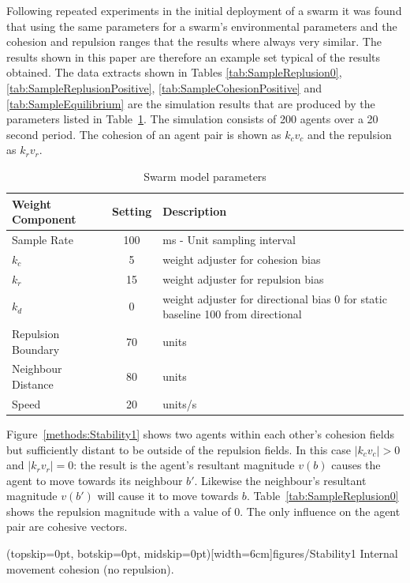 \documentclass{ieeeaccess}
\begin{document}
Following repeated experiments in the initial deployment of a swarm it was found that using the same parameters for a swarm's environmental parameters and the cohesion and repulsion ranges that the results where always very similar. The results shown in this paper are therefore an example set typical of the results obtained. The data extracts shown in Tables \ref{tab:SampleReplusion0}, \ref{tab:SampleReplusionPositive}, \ref{tab:SampleCohesionPositive} and  \ref{tab:SampleEquilibrium} are the simulation results that are produced by the parameters listed in Table~\ref{tab:MetricPhysics1}. The simulation consists of 200 agents over a 20 second period. The cohesion of an agent pair is shown as $k_cv_c$ and the repulsion as $k_rv_r$.

\begin{table}[H]
\begin{center}
\begin{tabular}{| p{2.5cm} | c | p{3cm} |}
\hline
\bf Weight \bf Component & \bf Setting & \bf Description \\ \hline
Sample Rate & 100 & ms - Unit sampling interval\\  \hline
$k_c$ & 5 & weight adjuster for cohesion bias\\  \hline
$k_r$ & 15 & weight adjuster for repulsion  bias\\  \hline
$k_d$ & 0 & weight adjuster for directional bias 0 for static baseline 100 from directional\\  \hline
Repulsion Boundary & 70 & units\\  \hline
Neighbour Distance & 80 & units\\  \hline
Speed & 20 & units/s\\  \hline
\end{tabular}\caption{Swarm model parameters} \label{tab:MetricPhysics1}
\end{center}
\end{table}

Figure~\ref{methods:Stability1} shows two agents within each other's cohesion fields but sufficiently distant to be outside of the repulsion fields. In this case $|k_cv_c| > 0$ and $|k_rv_r| = 0$: the result is the agent's resultant magnitude $v(b)$ causes the agent to move towards its neighbour $b'$. Likewise the neighbour's resultant magnitude $v(b')$ will cause it to move towards $b$. Table~\ref{tab:SampleReplusion0} shows the repulsion magnitude with a value of 0. The only influence on the agent pair are cohesive vectors. 

\Figure[t!](topskip=0pt, botskip=0pt, midskip=0pt)[width=6cm]{figures/Stability1}
{Internal movement cohesion (no repulsion).\label{methods:Stability1}}
\end{document}
